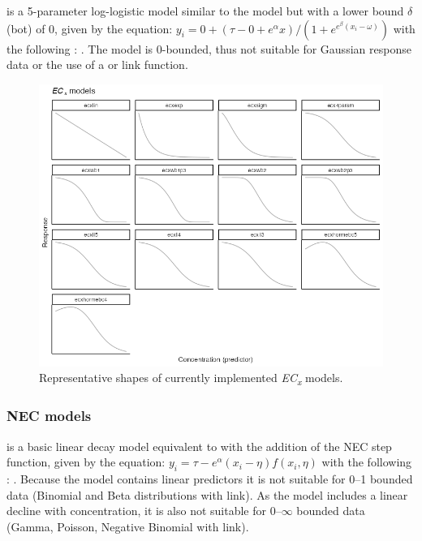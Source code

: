 \documentclass[
  shortnames]{jss}
\begin{document}
 is a 5-parameter log-logistic model similar to the  model but with a lower bound \(\delta\) (bot) of 0, given by the equation:
\(y_i = 0 + (\tau - 0 + e^{\alpha} x)/ (1 + e^{e^{\beta} (x_i - \omega)})\)
with the following : . The model is 0-bounded, thus not suitable for Gaussian response data or the use of a  or  link function.

\begin{figure}[ht]
  \centering
  \includegraphics[width=1\textwidth]{../vignettes/vignette-fig-exmp2b-theoretical_ecx_curves.png}
  \caption{Representative shapes of currently implemented  \textit{EC\textsubscript{x}} models.}
  \label{fig1}
\end{figure}

\subsubsection[NEC models]{NEC models}\label{nec-models}

 is a basic linear decay model equivalent to  with the addition of the NEC step function, given by the equation:
\(y_i = \tau - e^{\alpha} \left(x_i - \eta \right) f(x_i, \eta)\)
with the following : . Because the model contains linear predictors it is not suitable for 0--1 bounded data (Binomial and Beta distributions with  link). As the model includes a linear decline with concentration, it is also not suitable for 0--\(\infty\) bounded data (Gamma, Poisson, Negative Binomial with  link).
\end{document}
